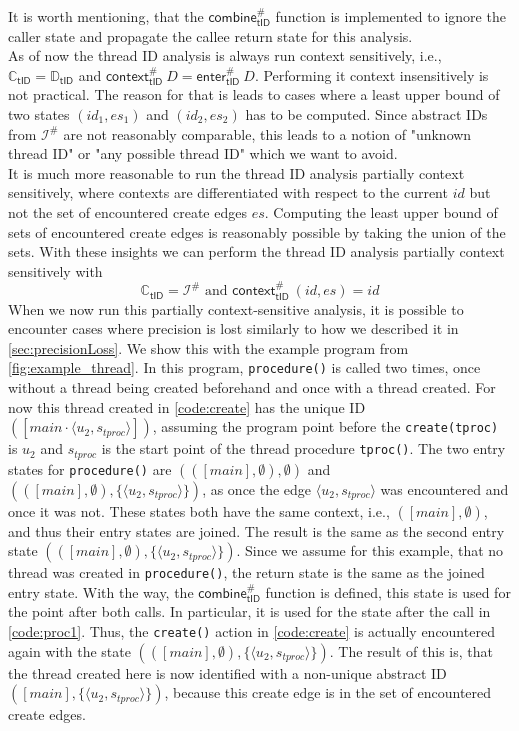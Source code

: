   It is worth mentioning, that the $\textsf{combine}^{\#}_\textsf{tID}$ function is implemented to ignore the caller state and propagate the callee return state for this analysis.
  \\
  As of now the thread ID analysis is always run context sensitively, i.e., $\mathbb{C}_\textsf{tID} = \mathbb{D}_\textsf{tID}$ and $\textsf{context}^{\#}_\textsf{tID}\ D = \textsf{enter}^{\#}_\textsf{tID}\ D$. Performing it context insensitively is not practical. The reason for that is leads to cases where a least upper bound of two states $(id_1, es_1)$ and $(id_2, es_2)$ has to be computed. Since abstract IDs from $\mathcal{I}^{\#}$ are not reasonably comparable, this leads to a notion of "unknown thread ID" or "any possible thread ID" which we want to avoid.\\
  It is much more reasonable to run the thread ID analysis partially context sensitively, where contexts are differentiated with respect to the current $id$ but not the set of encountered create edges $es$. Computing the least upper bound of sets of encountered create edges is reasonably possible by taking the union of the sets. With these insights we can perform the thread ID analysis partially context sensitively with
  \[\mathbb{C}_\textsf{tID} = \mathcal{I}^{\#} \text{ and } \textsf{context}^{\#}_\textsf{tID}\ (id, es) = id\]
  When we now run this partially context-sensitive analysis, it is possible to encounter cases where precision is lost similarly to how we described it in \autoref{sec:precisionLoss}. We show this with the example program from \autoref{fig:example_thread}. In this program, \texttt{procedure()} is called two times, once without a thread being created beforehand and once with a thread created. For now this thread created in \autoref{code:create} has the unique ID $([main \cdot \langle u_2, s_{tproc} \rangle])$, assuming the program point before the \texttt{create(tproc)} is $u_2$ and $s_{tproc}$ is the start point of the thread procedure \texttt{tproc()}. The two entry states for \texttt{procedure()} are $(([main], \emptyset), \emptyset)$ and $(([main], \emptyset), \{\langle u_2, s_{tproc} \rangle\})$, as once the edge $\langle u_2, s_{tproc} \rangle$ was encountered and once it was not. These states both have the same context, i.e., $([main], \emptyset)$, and thus their entry states are joined. The result is the same as the second entry state $(([main], \emptyset), \{\langle u_2, s_{tproc} \rangle\})$. Since we assume for this example, that no thread was created in \texttt{procedure()}, the return state is the same as the joined entry state. With the way, the $\textsf{combine}^{\#}_\textsf{tID}$ function is defined, this state is used for the point after both calls. In particular, it is used for the state after the call in \autoref{code:proc1}. Thus, the \texttt{create()} action in \autoref{code:create} is actually encountered again with the state $(([main], \emptyset), \{\langle u_2, s_{tproc} \rangle\})$. The result of this is, that the thread created here is now identified with a non-unique abstract ID $([main], \{\langle u_2, s_{tproc} \rangle\})$, because this create edge is in the set of encountered create edges.\\
